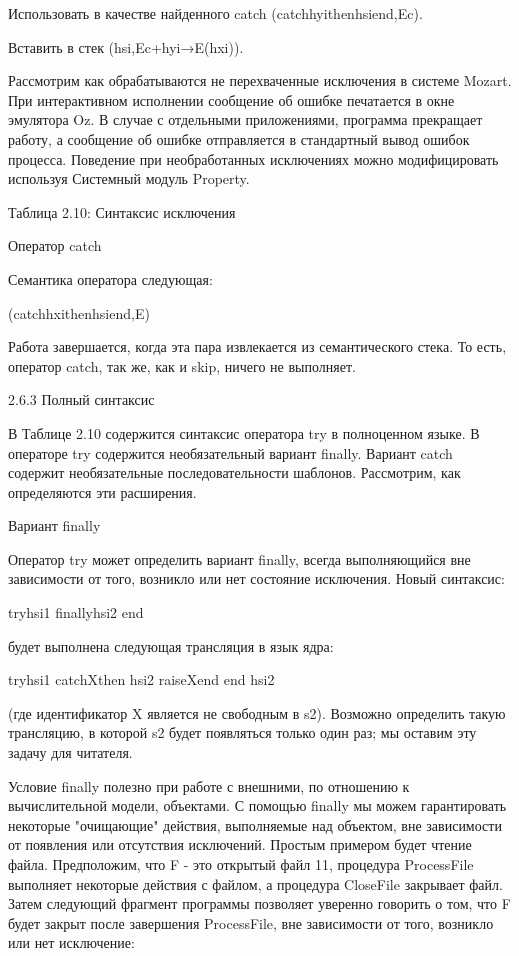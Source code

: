 Использовать в качестве найденного catch (catchhyithenhsiend,Ec).

Вставить в стек (hsi,Ec+{hyi→E(hxi)}).

Рассмотрим как обрабатываются не перехваченные исключения в системе Mozart. При интерактивном исполнении сообщение об ошибке печатается в окне эмулятора Oz. В случае с отдельными приложениями, программа прекращает работу, а сообщение об ошибке отправляется в стандартный вывод ошибок процесса. Поведение при необработанных исключениях можно модифицировать используя Системный модуль Property.

Таблица 2.10: Синтаксис исключения

Оператор catch

Семантика оператора следующая:

(catchhxithenhsiend,E)

Работа завершается, когда эта пара извлекается из семантического стека. То есть, оператор catch, так же, как и skip, ничего не выполняет.

2.6.3 Полный синтаксис

В Таблице 2.10 содержится синтаксис оператора try в полноценном языке. В операторе try содержится необязательный вариант finally. Вариант catch содержит необязательные последовательности шаблонов. Рассмотрим, как определяются эти расширения.

Вариант finally

Оператор try может определить вариант finally, всегда выполняющийся вне зависимости от того, возникло или нет состояние исключения. Новый синтаксис:

tryhsi1 finallyhsi2 end

будет выполнена следующая трансляция в язык ядра:

tryhsi1
catchXthen
hsi2
raiseXend
end
hsi2

(где идентификатор X является не свободным в s2). Возможно определить такую трансляцию, в которой s2 будет появляться только один раз; мы оставим эту задачу для читателя.

Условие finally полезно при работе с внешними, по отношению к вычислительной модели, объектами. С помощью finally мы можем гарантировать некоторые "очищающие" действия, выполняемые над объектом, вне зависимости от появления или отсутствия исключений. Простым примером будет чтение файла. Предположим, что F - это открытый файл 11, процедура ProcessFile выполняет некоторые действия с файлом, а процедура CloseFile закрывает файл. Затем следующий фрагмент программы позволяет уверенно говорить о том, что F будет закрыт после завершения ProcessFile, вне зависимости от того, возникло или нет исключение:

